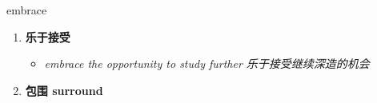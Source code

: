 
\begin{frame}
{\huge embrace}
\begin{center}
\begin{enumerate}\Large
  \item \textbf{乐于接受}
  \begin{itemize}
    \item \em{\Large{embrace the opportunity to study further 乐于接受继续深造的机会}}
  \end{itemize}
  \item \textbf{包围 surround}
\end{enumerate}
\end{center}
\end{frame}
